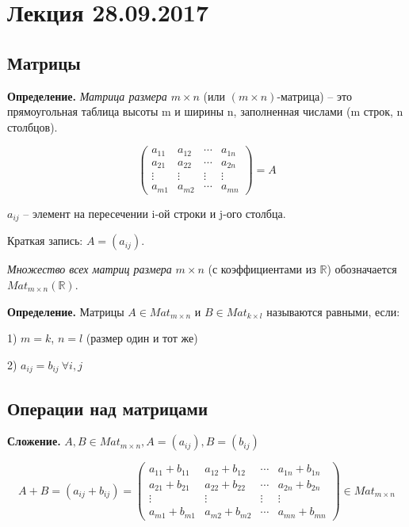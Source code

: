 \section{Лекция 28.09.2017}

\subsection{Матрицы}

\vspace{\baselineskip}
\textbf{Определение.} \textit{Матрица размера $m \times n$} (или $(m \times n)$-матрица) -- это прямоугольная таблица высоты m и ширины n, заполненная числами (m строк, n столбцов).

\[
	\begin{pmatrix}
		a_{11} & a_{12} & \cdots & a_{1n} \\
		a_{21} & a_{22} & \cdots & a_{2n} \\
       \vdots & \vdots & \vdots& \vdots \\ 
       a_{m1} & a_{m2} & \cdots & a_{mn}
	\end{pmatrix}
    = A
\]

\vspace{\baselineskip}
$a_{ij}$ -- элемент на пересечении i-ой строки и j-ого столбца.

Краткая запись: $A = (a_{ij})$.

\vspace{\baselineskip}
\textit{Множество всех матриц размера} $m \times n$ (с коэффициентами из $\mathbb{R}$) обозначается $Mat_{m\times n}(\mathbb{R})$. 

\vspace{\baselineskip}
\textbf{Определение.} Матрицы $A \in Mat_{m\times n}$ и $B \in Mat_{k\times l}$ называются равными, если:

1) $m = k$, $n = l$ (размер один и тот же)

2) $a_{ij} = b_{ij} \ \forall i, j$

\vspace{\baselineskip}
\subsection{Операции над матрицами}

\vspace{\baselineskip}
\textbf{Сложение.} $A, B \in Mat_{m\times n}, A = (a_{ij}), B = (b_{ij})$

\[A + B = (a_{ij} + b_{ij}) = 
\begin{pmatrix}
		a_{11} + b_{11} & a_{12} + b_{12} & \cdots & a_{1n} + b_{1n} \\
		a_{21} + b_{21} & a_{22} + b_{22} & \cdots & a_{2n} + b_{2n} \\
       \vdots & \vdots & \vdots& \vdots \\ 
       a_{m1} + b_{m1} & a_{m2} + b_{m2} & \cdots & a_{mn} + b_{mn}
\end{pmatrix} \in Mat_{m\times n}
\]

